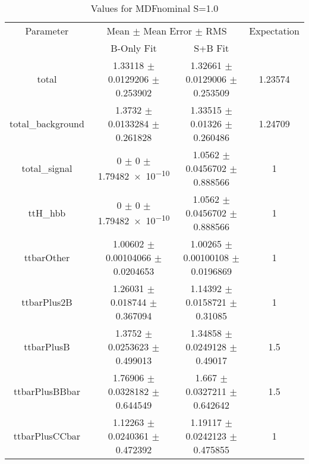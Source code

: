 \begin{table}
\centering
\caption{Values for MDFnominal S=1.0}
\begin{tabular}{cccc}
\toprule
Parameter & \multicolumn{2}{c}{Mean $\pm$ Mean Error $\pm$ RMS} & Expectation\\
 & B-Only Fit & S+B Fit & \\
\midrule
total & \num{1.33118} $\pm$ \num{0.0129206} $\pm$ \num{0.253902} & \num{1.32661} $\pm$ \num{0.0129006} $\pm$ \num{0.253509} & \num{1.23574}\\
total\_background & \num{1.3732} $\pm$ \num{0.0133284} $\pm$ \num{0.261828} & \num{1.33515} $\pm$ \num{0.01326} $\pm$ \num{0.260486} & \num{1.24709}\\
total\_signal & \num{0} $\pm$ \num{0} $\pm$ \num{1.79482e-10} & \num{1.0562} $\pm$ \num{0.0456702} $\pm$ \num{0.888566} & \num{1}\\
ttH\_hbb & \num{0} $\pm$ \num{0} $\pm$ \num{1.79482e-10} & \num{1.0562} $\pm$ \num{0.0456702} $\pm$ \num{0.888566} & \num{1}\\
ttbarOther & \num{1.00602} $\pm$ \num{0.00104066} $\pm$ \num{0.0204653} & \num{1.00265} $\pm$ \num{0.00100108} $\pm$ \num{0.0196869} & \num{1}\\
ttbarPlus2B & \num{1.26031} $\pm$ \num{0.018744} $\pm$ \num{0.367094} & \num{1.14392} $\pm$ \num{0.0158721} $\pm$ \num{0.31085} & \num{1}\\
ttbarPlusB & \num{1.3752} $\pm$ \num{0.0253623} $\pm$ \num{0.499013} & \num{1.34858} $\pm$ \num{0.0249128} $\pm$ \num{0.49017} & \num{1.5}\\
ttbarPlusBBbar & \num{1.76906} $\pm$ \num{0.0328182} $\pm$ \num{0.644549} & \num{1.667} $\pm$ \num{0.0327211} $\pm$ \num{0.642642} & \num{1.5}\\
ttbarPlusCCbar & \num{1.12263} $\pm$ \num{0.0240361} $\pm$ \num{0.472392} & \num{1.19117} $\pm$ \num{0.0242123} $\pm$ \num{0.475855} & \num{1}\\
\bottomrule
\end{tabular}
\end{table}